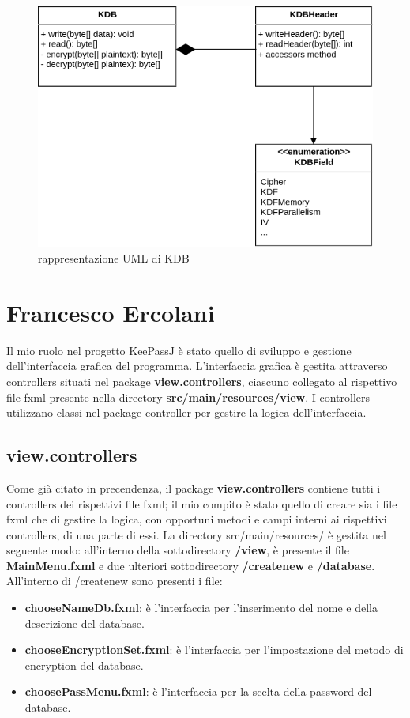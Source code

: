 \documentclass[a4paper,12pt]{report}
\begin{document}
\begin{figure}[h]
\centering{}
\includegraphics[width=\textwidth]{kdb}
\caption{rappresentazione UML di KDB}
\end{figure}

\section*{Francesco Ercolani}
Il mio ruolo nel progetto KeePassJ è stato quello di sviluppo e gestione dell'interfaccia grafica del programma.
L'interfaccia grafica è gestita attraverso controllers situati nel package \textbf{view.controllers}, ciascuno collegato al rispettivo file fxml presente nella directory \textbf{src/main/resources/view}. 
I controllers utilizzano classi nel package controller per gestire la logica dell'interfaccia.

\subsection*{view.controllers}

Come già citato in precendenza, il package \textbf{view.controllers} contiene tutti i controllers dei rispettivi file fxml; il mio compito è stato quello di creare sia i file fxml che di gestire la logica, con opportuni metodi e campi interni ai rispettivi controllers, di una parte di essi.
La directory src/main/resources/ è gestita nel seguente modo: all'interno della sottodirectory \textbf{/view}, è presente il file \textbf{MainMenu.fxml} e due ulteriori sottodirectory \textbf{/createnew} e \textbf{/database}.
All'interno di /createnew sono presenti i file:
\begin{itemize}
    \item \textbf{chooseNameDb.fxml}: è l'interfaccia per l'inserimento del nome e della descrizione del database.
    \item \textbf{chooseEncryptionSet.fxml}: è l'interfaccia per l'impostazione del metodo di encryption del database.
    \item \textbf{choosePassMenu.fxml}: è l'interfaccia per la scelta della password del database.
\end{itemize}
\end{document}
